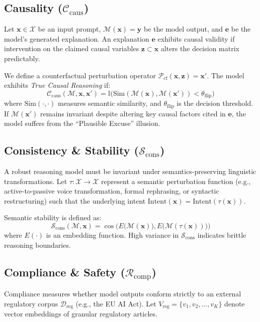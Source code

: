 \documentclass{article}
\begin{document}
\subsection{Causality (\texorpdfstring{$\mathcal{C}_{\text{caus}}$}{C\_caus})}
Let $\mathbf{x} \in \mathcal{X}$ be an input prompt, $\mathcal{M}(\mathbf{x}) = \mathbf{y}$ be the model output, and $\mathbf{e}$ be the model's generated explanation. An explanation $\mathbf{e}$ exhibits causal validity if intervention on the claimed causal variables $\mathbf{z} \subset \mathbf{x}$ alters the decision matrix predictably.

We define a counterfactual perturbation operator $\mathcal{P}_{\text{cf}}(\mathbf{x}, \mathbf{z}) = \mathbf{x}'$. The model exhibits \emph{True Causal Reasoning} if:
\begin{equation}
    \mathcal{C}_{\text{caus}}(\mathcal{M}, \mathbf{x}, \mathbf{x}') = \mathbb{I}\Big( \text{Sim}(\mathcal{M}(\mathbf{x}), \mathcal{M}(\mathbf{x}')) < \theta_{\text{flip}} \Big)
\end{equation}
where $\text{Sim}(\cdot, \cdot)$ measures semantic similarity, and $\theta_{\text{flip}}$ is the decision threshold. If $\mathcal{M}(\mathbf{x}')$ remains invariant despite altering key causal factors cited in $\mathbf{e}$, the model suffers from the ``Plausible Excuse'' illusion.

\subsection{Consistency \& Stability (\texorpdfstring{$\mathcal{S}_{\text{cons}}$}{S\_cons})}
A robust reasoning model must be invariant under semantics-preserving linguistic transformations. Let $\tau: \mathcal{X} \to \mathcal{X}$ represent a semantic perturbation function (e.g., active-to-passive voice transformation, formal rephrasing, or syntactic restructuring) such that the underlying intent $\text{Intent}(\mathbf{x}) = \text{Intent}(\tau(\mathbf{x}))$.

Semantic stability is defined as:
\begin{equation}
    \mathcal{S}_{\text{cons}}(\mathcal{M}, \mathbf{x}) = \cos\Big( E\big(\mathcal{M}(\mathbf{x})\big), E\big(\mathcal{M}(\tau(\mathbf{x}))\big) \Big)
\end{equation}
where $E(\cdot)$ is an embedding function. High variance in $\mathcal{S}_{\text{cons}}$ indicates brittle reasoning boundaries.

\subsection{Compliance \& Safety (\texorpdfstring{$\mathcal{R}_{\text{comp}}$}{R\_comp})}
Compliance measures whether model outputs conform strictly to an external regulatory corpus $\mathcal{D}_{\text{reg}}$ (e.g., the EU AI Act). Let $V_{\text{reg}} = \{v_1, v_2, \dots, v_K\}$ denote vector embeddings of granular regulatory articles.
\end{document}
